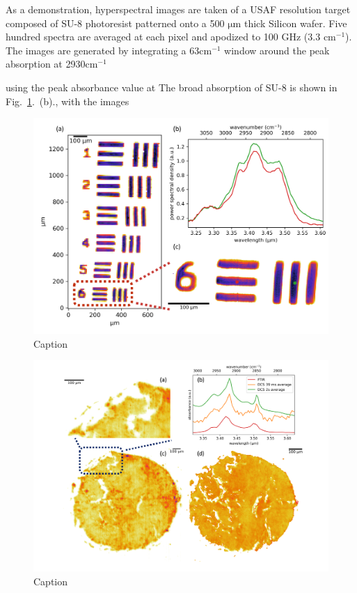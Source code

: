 \documentclass{optica-article}
\begin{document}
As a demonstration, hyperspectral images are taken of a USAF resolution target composed of SU-8 photoresist patterned onto a 500 $\mathrm{\mu m}$ thick Silicon wafer. Five hundred spectra are averaged at each pixel and apodized to 100 GHz (3.3 $\mathrm{cm^{-1}}$). The images are generated by integrating a 63$\mathrm{cm^{-1}}$ window around the peak absorption at 2930$\mathrm{cm^{-1}}$

using the peak absorbance value at The broad absorption of SU-8 is shown in Fig.~\ref{fig:su8}.~(b)., with the images 

\begin{figure}[h]
    \centering
    \includegraphics[width=\linewidth]{su8_image.png}
    \caption{Caption}
    \label{fig:su8}
\end{figure}

\begin{figure}[h]
    \centering
    \includegraphics[width=\linewidth]{bio_image_w_FTIR_comparison.png}
    \caption{Caption}
    \label{fig:bio}
\end{figure}
\end{document}
